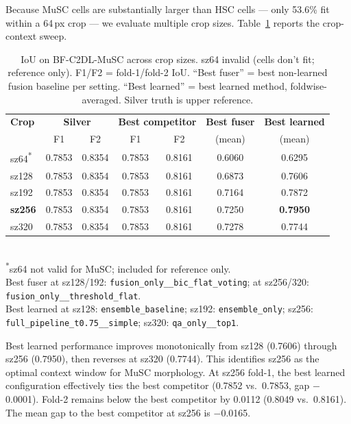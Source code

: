 Because MuSC cells are substantially larger than HSC cells — only 53.6\% fit within a 64\,px crop
— we evaluate multiple crop sizes. Table~\ref{tab:musc_results} reports the crop-context sweep.

\begin{table}[ht]
\centering
\caption{IoU on BF-C2DL-MuSC across crop sizes. sz64 invalid (cells don't fit; reference only). F1/F2 = fold-1/fold-2 IoU. ``Best fuser'' = best non-learned fusion baseline per setting. ``Best learned'' = best learned method, foldwise-averaged. Silver truth is upper reference.}
\label{tab:musc_results}
\begin{tabular}{lcccccc}
\hline
\textbf{Crop} & \multicolumn{2}{c}{\textbf{Silver}} & \multicolumn{2}{c}{\textbf{Best competitor}} & \textbf{Best fuser} & \textbf{Best learned} \\
              & F1 & F2 & F1 & F2 & (mean) & (mean) \\
\hline
sz64\textsuperscript{*}  & 0.7853 & 0.8354 & 0.7853 & 0.8161 & 0.6060 & 0.6295 \\
sz128 & 0.7853 & 0.8354 & 0.7853 & 0.8161 & 0.6873 & 0.7606 \\
sz192 & 0.7853 & 0.8354 & 0.7853 & 0.8161 & 0.7164 & 0.7872 \\
\textbf{sz256} & 0.7853 & 0.8354 & 0.7853 & 0.8161 & 0.7250 & \textbf{0.7950} \\
sz320 & 0.7853 & 0.8354 & 0.7853 & 0.8161 & 0.7278 & 0.7744 \\
\hline
\end{tabular}
\smallskip\\
\small \textsuperscript{*}sz64 not valid for MuSC; included for reference only.\\
\small Best fuser at sz128/192: \texttt{fusion\_only\_\_bic\_flat\_voting}; at sz256/320: \texttt{fusion\_only\_\_threshold\_flat}.\\
\small Best learned at sz128: \texttt{ensemble\_baseline}; sz192: \texttt{ensemble\_only}; sz256: \texttt{full\_pipeline\_t0.75\_\_simple}; sz320: \texttt{qa\_only\_\_top1}.
\end{table}

Best learned performance improves monotonically from sz128 (0.7606) through sz256 (0.7950), then
reverses at sz320 (0.7744). This identifies sz256 as the optimal context window for MuSC
morphology. At sz256 fold-1, the best learned configuration effectively ties the best competitor
(0.7852 vs.\ 0.7853, gap $-$0.0001). Fold-2 remains below the best competitor by 0.0112 (0.8049
vs.\ 0.8161). The mean gap to the best competitor at sz256 is $-$0.0165.

